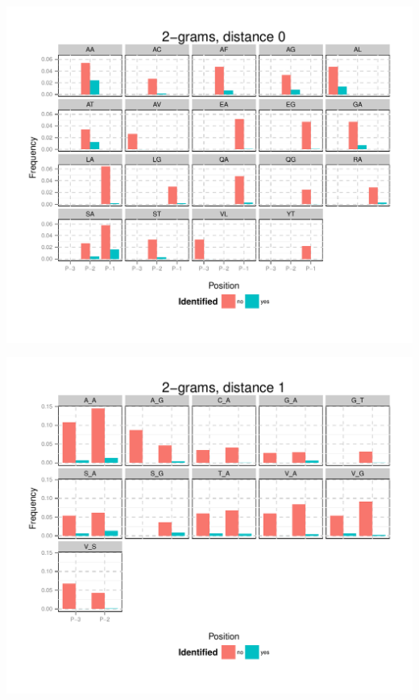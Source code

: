 \documentclass[10pt]{beamer}\usepackage[]{graphicx}\usepackage[]{color}
\makeatletter
\def\maxwidth{ %
  \ifdim\Gin@nat@width>\linewidth
    \linewidth
  \else
    \Gin@nat@width
  \fi
}
\makeatother
\begin{document}
\begin{frame}

\includegraphics[width=\maxwidth]{figure/unnamed-chunk-5-1} 

\end{frame}



\begin{frame}

\includegraphics[width=\maxwidth]{figure/unnamed-chunk-6-1} 

\end{frame}
\end{document}
